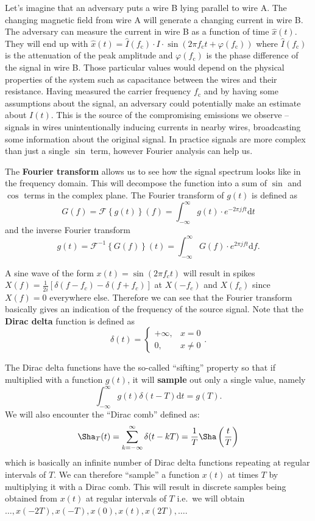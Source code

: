 \documentclass[a4paper,12pt,twoside,openright]{report}
\begin{document}
Let's imagine that an adversary puts a wire B lying parallel to wire A. The changing magnetic field from wire A will generate a changing current in wire B. The adversary can measure the current in wire B as a function of time $\hat{x}(t)$. They will end up with $\hat{x}(t) = \hat{I}(f_\text{c}) \cdot I  \cdot \sin( 2\pi f_\text{c} t + \varphi(f_\text{c}))$ where $\hat{I}(f_\text{c})$ is the attenuation of the peak amplitude and $\varphi( f_\text{c})$ is the phase difference of the signal in wire B. Those particular values would depend on the physical properties of the system such as capacitance between the wires and their resistance. Having measured the carrier frequency $f_\text{c}$ and by having some assumptions about the signal, an adversary could potentially make an estimate about $I(t)$. This is the source of the compromising emissions we observe -- signals in wires unintentionally inducing currents in nearby wires, broadcasting some information about the original signal. In practice signals are more complex than just a single $\sin$ term, however Fourier analysis can help us.

The \textbf{Fourier transform} \cite{briggs1995dft} allows us to see how the signal spectrum looks like in the frequency domain. This will decompose the function into a sum of $\sin$ and $\cos$ terms in the complex plane. The Fourier transform of $g(t)$ is defined as
$$G(f)=\mathcal{F} \left\{ g(t) \right\} (f) = \int_{-\infty}^{\infty} g(t) \cdot e^{- 2 \pi j f t} \text{d} t $$
and the inverse Fourier transform
$$g(t) = \mathcal{F}^{-1} \left\{ G(f) \right\} (t) = \int_{-\infty}^{\infty} G(f) \cdot e^{2 \pi j f t} \text{d} f.$$

A sine wave of the form $x(t) = \sin(2 \pi f_{c} t)$ will result in spikes $X(f) = \frac{1}{2 i} [\delta(f - f_{c}) - \delta(f
 + f_{c})]$ at $X(-f_{c})$ and $X(f_{c})$ since $X(f) = 0$ everywhere else. Therefore we can see that the Fourier transform basically gives an indication of the frequency of the source signal. Note that the \textbf{Dirac delta} function is defined as
$$ \delta(t) = \begin{cases} +\infty, & x = 0 \\ 0, & x \neq 0 \end{cases}.$$

The Dirac delta functions have the so-called ``sifting'' property so that if multiplied with a function $g(t)$, it will \textbf{sample} out only a single value, namely
$$ \int_{-\infty}^{\infty} g(t) \delta(t - T) \text{d} t = g(T) .$$
We will also encounter the ``Dirac comb'' defined as:
$$ \Sha_{T}(t) = \sum_{k=-\infty}^{\infty} \delta(t - kT) = \frac{1}{T} \Sha \left( \frac{t}{T} \right) $$
which is basically an infinite number of Dirac delta functions repeating at regular intervals of $T$. We can therefore ``sample'' a function $x(t)$ at times $T$ by multiplying it with a Dirac comb. This will result in discrete samples being obtained from $x(t)$ at regular intervals of $T$ i.e.\  we will obtain $\dots, x(-2 T), x(-T), x(0), x(t), x(2 T), \dots$.
\end{document}
